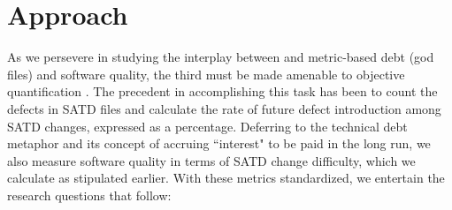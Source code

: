 

\section{Approach}
\label{chap4:sec:approach}
As we persevere in studying the interplay between \SATD and metric-based debt (god files) and software quality, the third must be made amenable to objective quantification \cite{Kamei-tse-2013,Kim-tse-2008,sliwerski-msr-2005}. The precedent in accomplishing this task has been to count the defects in SATD files and calculate the rate of future defect introduction among SATD changes, expressed as a percentage. Deferring to the technical debt metaphor and its concept of accruing ``interest" to be paid in the long run, we also measure software quality in terms of SATD change difficulty, which we calculate as stipulated earlier. With these metrics standardized, we entertain the research questions that follow:

